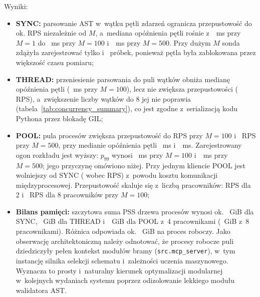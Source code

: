 Wyniki:
\begin{itemize}
    \item \textbf{SYNC:} parsowanie AST w~wątku pętli zdarzeń ogranicza przepustowość do ok. \wynCcSyncHundredRps{} RPS niezależnie od $M$, a~mediana opóźnienia pętli rośnie z~\wynCcSyncOneLagMed~ms przy $M = 1$ do \wynCcSyncHundredLagMed~ms przy $M = 100$ i~\wynCcSyncFivehundredLagMed~ms przy $M = 500$. Przy dużym $M$ sonda zdążyła zarejestrować tylko \wynCcSyncHundredLagN{} i~\wynCcSyncFivehundredLagN{} próbek, ponieważ pętla była zablokowana przez większość czasu pomiaru;
    \item \textbf{THREAD:} przeniesienie parsowania do puli wątków obniża medianę opóźnienia pętli (\wynCcThreadHundredLagMed~ms przy $M = 100$), lecz nie zwiększa przepustowości (\wynCcThreadHundredRps{} RPS), a~zwiększenie liczby wątków do 8 jej nie poprawia (tabela~\ref{tab:concurrency_summary}), co jest zgodne z~serializacją kodu Pythona przez blokadę GIL;
    \item \textbf{POOL:} pula procesów zwiększa przepustowość do \wynCcPoolHundredRps{} RPS przy $M = 100$ i~\wynCcPoolFivehundredRps{} RPS przy $M = 500$, przy medianie opóźnienia pętli \wynCcPoolHundredLagMed~ms i~\wynCcPoolFivehundredLagMed~ms. Zarejestrowany ogon rozkładu jest wyższy: $p_{99}$ wynosi \wynCcPoolHundredLagPnn~ms przy $M = 100$ i~\wynCcPoolFivehundredLagPnn~ms przy $M = 500$; jego przyczynę omówiono niżej. Przy jednym kliencie POOL jest wolniejszy od SYNC (\wynCcPoolOneRps{} wobec \wynCcSyncOneRps{} RPS) z~powodu kosztu komunikacji międzyprocesowej. Przepustowość skaluje się z~liczbą pracowników: \wynCcPoolWTwoRps{} RPS dla 2 i~\wynCcPoolWEightRps{} RPS dla 8 pracowników przy $M = 100$;
    \item \textbf{Bilans pamięci:} szczytowa suma PSS drzewa procesów wynosi ok. \wynCcSyncHundredMem~GiB dla SYNC, \wynCcThreadHundredMem~GiB dla THREAD i~\wynCcPoolHundredMem~GiB dla POOL z~4 pracownikami (\wynCcPoolWEightMem~GiB z~8 pracownikami). Różnica odpowiada ok. \wynCcPoolPerWorker~GiB na proces roboczy. Jako obserwację architektoniczną należy odnotować, że procesy robocze puli dziedziczyły pełen kontekst modułów bramy (\texttt{src.mcp\_server}), w~tym instancję silnika selekcji schematu i~zależności uczenia maszynowego. Wyznacza to prosty i~naturalny kierunek optymalizacji modularnej w~kolejnych wydaniach systemu poprzez odizolowanie lekkiego modułu walidatora AST.
\end{itemize}
